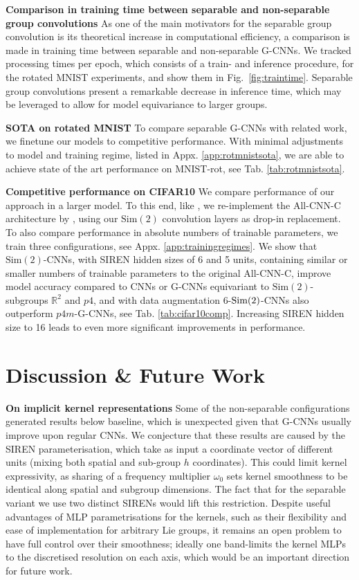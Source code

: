 \documentclass[nohyperref]{article}
\theoremstyle{plain}
\theoremstyle{definition}
\theoremstyle{remark}
\begin{document}
\textbf{Comparison in training time between separable and non-separable group convolutions}
As one of the main motivators for the separable group convolution is its theoretical increase in computational efficiency, a comparison is made in training time between separable and non-separable G-CNNs. We tracked processing times per epoch, which consists of a train- and inference procedure, for the rotated MNIST experiments, and show them in Fig.~\ref{fig:traintime}. Separable group convolutions present a remarkable decrease in inference time, which may be leveraged to allow for model equivariance to larger groups.

\textbf{SOTA on rotated MNIST} To compare separable G-CNNs with related work, we finetune our models to competitive performance. With minimal adjustments to model and training regime, listed in Appx. \ref{app:rotmnistsota}, we are able to achieve state of the art performance on MNIST-rot, see Tab. \ref{tab:rotmnistsota}.

\textbf{Competitive performance on CIFAR10} We compare performance of our approach in a larger model. To this end, like \citep{cohen2016group}, we re-implement the All-CNN-C architecture by \citet{springenberg2014striving}, using our $\mathrm{Sim(2)}$ convolution layers as drop-in replacement. To also compare performance in absolute numbers of trainable parameters, we train three configurations, see Appx. \ref{app:trainingregimes}. We show that $\mathrm{Sim(2)}$-CNNs, with SIREN hidden sizes of 6 and 5 units, containing similar or smaller numbers of trainable parameters to the original All-CNN-C, improve model accuracy compared to CNNs or G-CNNs equivariant to $\mathrm{Sim(2)}$-subgroups $\mathbb{R}^2$ and $p4$, and with data augmentation 6-${\rm Sim(2)}$-CNNs also outperform $p4m$-G-CNNs, see Tab. \ref{tab:cifar10comp}. Increasing SIREN hidden size to 16 leads to even more significant improvements in performance.

\section{Discussion \& Future Work}\label{sec:discussion}
\textbf{On implicit kernel representations} Some of the non-separable configurations generated results below baseline, which is unexpected given that G-CNNs usually improve upon regular CNNs. We conjecture that these results are caused by the SIREN parameterisation, which take as input a coordinate vector of different units (mixing both spatial and sub-group $h$ coordinates). This could limit kernel expressivity, as sharing of a frequency multiplier $\omega_0$ sets kernel smoothness to be identical along spatial and subgroup dimensions. The fact that for the separable variant we use two distinct SIRENs would lift this restriction. Despite useful advantages of MLP parametrisations for the kernels, such as their flexibility and ease of implementation for arbitrary Lie groups, it remains an open problem to have full control over their smoothness; ideally one band-limits the kernel MLPs to the discretised resolution on each axis, which would be an important direction for future work.
\end{document}
